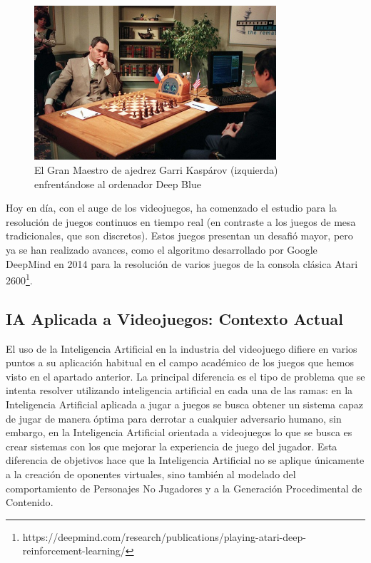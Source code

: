 \begin{figure}[h]
	\includegraphics[width=0.8\textwidth]{images/estadodelarte/ai/deepblue-vs-kasparov}
	\centering
	\caption{El Gran Maestro de ajedrez Garri Kaspárov (izquierda) enfrentándose al ordenador Deep Blue}
\end{figure}

Hoy en día, con el auge de los videojuegos, ha comenzado el estudio para la resolución de juegos continuos en tiempo real (en contraste a los juegos de mesa tradicionales, que son discretos). Estos juegos presentan un desafió mayor, pero ya se han realizado avances, como el algoritmo desarrollado por Google DeepMind en 2014 para la resolución de varios juegos de la consola clásica Atari 2600\footnote{https://deepmind.com/research/publications/playing-atari-deep-reinforcement-learning/}.

\subsection{IA Aplicada a Videojuegos: Contexto Actual}
El uso de la Inteligencia Artificial en la industria del videojuego difiere en varios puntos a su aplicación habitual en el campo académico de los juegos que hemos visto en el apartado anterior. La principal diferencia es el tipo de problema que se intenta resolver utilizando inteligencia artificial en cada una de las ramas: en la Inteligencia Artificial aplicada a jugar a juegos se busca obtener un sistema capaz de jugar de manera óptima para derrotar a cualquier adversario humano, sin embargo, en la Inteligencia Artificial orientada a videojuegos lo que se busca es crear sistemas con los que mejorar la experiencia de juego del jugador. Esta diferencia de objetivos hace que la Inteligencia Artificial no se aplique únicamente a la creación de oponentes virtuales, sino también al modelado del comportamiento de Personajes No Jugadores y a la Generación Procedimental de Contenido\cite{ai_and_games}.

